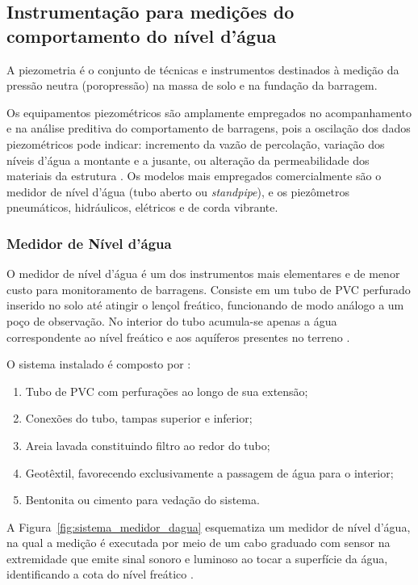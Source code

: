 \subsection{Instrumentação para medições do comportamento do nível d'água}
\label{subsec:piezometria}

A piezometria é o conjunto de técnicas e instrumentos destinados à medição
da pressão neutra (poropressão) na massa de solo e na fundação da
barragem.
 
Os equipamentos piezométricos são amplamente empregados no acompanhamento
e na análise preditiva do comportamento de barragens, pois a oscilação dos
dados piezométricos pode indicar: incremento da vazão de percolação,
variação dos níveis d'água a montante e a jusante, ou alteração da
permeabilidade dos materiais da estrutura \cite{machado2007}. Os modelos
mais empregados comercialmente são o medidor de nível d'água (tubo aberto
ou \textit{standpipe}), e os piezômetros pneumáticos, hidráulicos, elétricos
e de corda vibrante.

\subsubsection{Medidor de Nível d'água}
\label{subsubsec:medidor_nivel}

O medidor de nível d'água é um dos instrumentos mais elementares e de menor
custo para monitoramento de barragens. Consiste em um tubo de PVC perfurado
inserido no solo até atingir o lençol freático, funcionando de modo análogo
a um poço de observação. No interior do tubo acumula-se apenas a água
correspondente ao nível freático e aos aquíferos presentes no terreno
\cite{victorino2003piezometro}.
 
O sistema instalado é composto por \cite{victorino2003piezometro}:
\begin{enumerate}
    \item Tubo de PVC com perfurações ao longo de sua extensão;
    \item Conexões do tubo, tampas superior e inferior;
    \item Areia lavada constituindo filtro ao redor do tubo;
    \item Geotêxtil, favorecendo exclusivamente a passagem de água para o interior;
    \item Bentonita ou cimento para vedação do sistema.
\end{enumerate}

A Figura~\ref{fig:sistema_medidor_dagua} esquematiza um medidor de nível d'água, 
na qual a medição é executada por meio de um cabo graduado com sensor na extremidade que
emite sinal sonoro e luminoso ao tocar a superfície da água, identificando
a cota do nível freático \cite{fonseca2003auscultacao, machado2007}.
 
